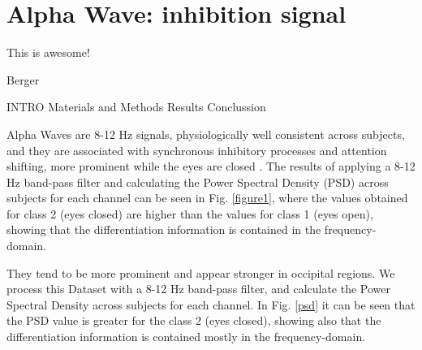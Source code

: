 \chapter{Alpha Wave: inhibition signal}

\epigraph{This is awesome!}{Berger}



INTRO
Materials and Methods
Results
Conclussion



Alpha Waves are 8-12 Hz signals, physiologically well consistent across subjects, and they are associated with synchronous inhibitory processes and attention shifting, more prominent while the eyes are closed \cite{c3}. The results of applying a 8-12 Hz band-pass filter and calculating the Power Spectral Density (PSD) across subjects for each channel can be seen in Fig. \ref{figure1}, where the values obtained for class 2 (eyes closed) are higher than the values for class 1 (eyes open), showing that the differentiation information is contained in the frequency-domain.
 
They tend to be more prominent  and appear stronger in occipital regions. We process this Dataset with a 8-12 Hz band-pass filter, and calculate the Power Spectral Density across subjects for each channel.  In Fig. \ref{psd} it can be seen that the PSD value is greater for the class 2 (eyes closed), showing also that the differentiation information is contained mostly in the frequency-domain.



